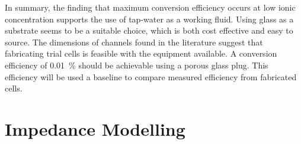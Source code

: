

    In summary, the finding that maximum conversion efficiency occurs at low ionic concentration supports the use of tap-water as a working fluid.
    Using glass as a substrate seems to be a suitable choice, which is both cost effective and easy to source.
    The dimensions of channels found in the literature suggest that fabricating trial cells is feasible with the equipment available.
    A conversion efficiency of \SI{0.01}{\percent} should be achievable using a porous glass plug.
    This efficiency will be used a baseline to compare measured efficiency from fabricated cells.


\section{Impedance Modelling}
  \label{sect:background_impedanceModelling}

